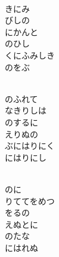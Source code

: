 \documentclass[10pt,b5j]{tarticle} %
\begin{document}
\begin{enumerate}
\begin{minipage}[c]{\blocksize}
    \end{minipage}
    \begin{minipage}[c]{\blocksize}
        
        \vspace{\linespace}
        \item~\\
        きにみ\\
        びしの\\
        にかんと\\
        のひし\\
        くにふみしき\\
        のをぶ
        
    \end{minipage}
    \begin{minipage}[c]{\blocksize}
        
        \vspace{\linespace}
        \item~\\
        のふれて\\
        なきりしは\\
        のするに\\
        えりぬの\\
        ぶにはりにく\\
        にはりにし
        
    \end{minipage}
    \begin{minipage}[c]{\blocksize}
        
        \vspace{\linespace}
        \item~\\
        のに\\
        りててをめつ\\
        をるの\\
        えぬとに\\
        のたな\\
        にはれぬ
    
    \end{minipage}
\end{enumerate} %
\end{document}
